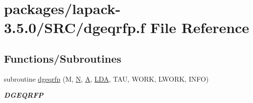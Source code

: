\hypertarget{dgeqrfp_8f}{}\section{packages/lapack-\/3.5.0/\+S\+R\+C/dgeqrfp.f File Reference}
\label{dgeqrfp_8f}
\subsection*{Functions/\+Subroutines}
\begin{DoxyCompactItemize}
\item 
subroutine \hyperlink{group__doubleGEcomputational_ga5dc72a0f55ff4c08f1a3596f56e04aaa}{dgeqrfp} (M, \hyperlink{polmisc_8c_a0240ac851181b84ac374872dc5434ee4}{N}, \hyperlink{classA}{A}, \hyperlink{example__user_8c_ae946da542ce0db94dced19b2ecefd1aa}{L\+D\+A}, T\+A\+U, W\+O\+R\+K, L\+W\+O\+R\+K, I\+N\+F\+O)
\begin{DoxyCompactList}\small\item\em {\bfseries D\+G\+E\+Q\+R\+F\+P} \end{DoxyCompactList}\end{DoxyCompactItemize}

